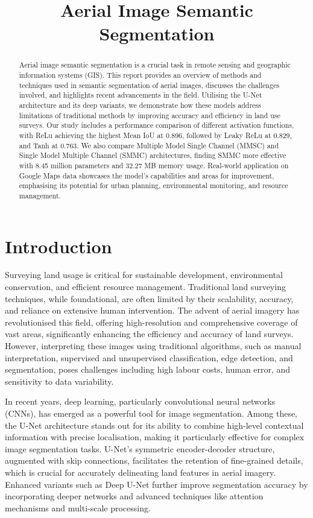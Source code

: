 \documentclass[conference]{IEEEtran}
\title{Aerial Image Semantic Segmentation}
\author{
    \IEEEauthorblockN{Chinatip Lawansuk}
    \IEEEauthorblockA{
        Department of Electrical Engineering and Computer Science\\
        National Taipei University of Technology\\
        Email: t112998405@ntut.edu.tw
    }
}
\begin{document}
\maketitle

\begin{abstract}
Aerial image semantic segmentation is a crucial task in remote sensing and geographic information systems (GIS). This report provides an overview of methods and techniques used in semantic segmentation of aerial images, discusses the challenges involved, and highlights recent advancements in the field. Utilising the U-Net architecture and its deep variants, we demonstrate how these models address limitations of traditional methods by improving accuracy and efficiency in land use surveys. Our study includes a performance comparison of different activation functions, with ReLu achieving the highest Mean IoU at 0.896, followed by Leaky ReLu at 0.829, and Tanh at 0.763. We also compare Multiple Model Single Channel (MMSC) and Single Model Multiple Channel (SMMC) architectures, finding SMMC more effective with 8.45 million parameters and 32.27 MB memory usage. Real-world application on Google Maps data showcases the model’s capabilities and areas for improvement, emphasising its potential for urban planning, environmental monitoring, and resource management.
\end{abstract}

\section{Introduction}
Surveying land usage is critical for sustainable development, environmental conservation, and efficient resource management. Traditional land surveying techniques, while foundational, are often limited by their scalability, accuracy, and reliance on extensive human intervention. The advent of aerial imagery has revolutionised this field, offering high-resolution and comprehensive coverage of vast areas, significantly enhancing the efficiency and accuracy of land surveys. However, interpreting these images using traditional algorithms, such as manual interpretation, supervised and unsupervised classification, edge detection, and segmentation, poses challenges including high labour costs, human error, and sensitivity to data variability.

In recent years, deep learning, particularly convolutional neural networks (CNNs), has emerged as a powerful tool for image segmentation. Among these, the U-Net architecture stands out for its ability to combine high-level contextual information with precise localisation, making it particularly effective for complex image segmentation tasks. U-Net's symmetric encoder-decoder structure, augmented with skip connections, facilitates the retention of fine-grained details, which is crucial for accurately delineating land features in aerial imagery. Enhanced variants such as Deep U-Net further improve segmentation accuracy by incorporating deeper networks and advanced techniques like attention mechanisms and multi-scale processing.
\end{document}
